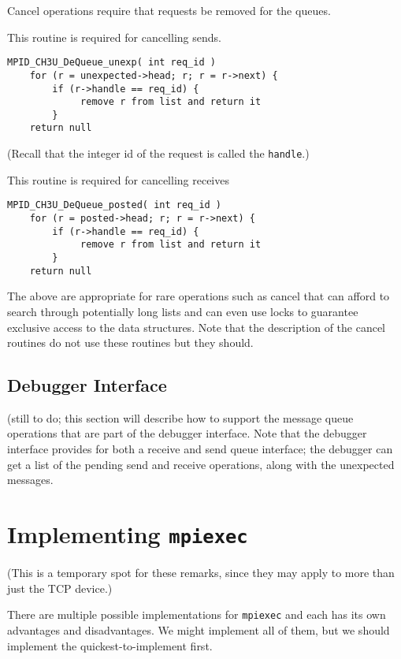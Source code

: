 \documentclass{article}
\def\code{\begingroup\makeustext\eatcode}
\def\eatcode#1{\texttt{#1}\endgroup}
\begin{document}
Cancel operations require that requests be removed for the queues.

This routine is required for cancelling sends.
\begin{verbatim}
MPID_CH3U_DeQueue_unexp( int req_id )
    for (r = unexpected->head; r; r = r->next) {
        if (r->handle == req_id) {
             remove r from list and return it
        }
    return null
\end{verbatim}
(Recall that the integer id of the request is called the \code{handle}.)

This routine is required for cancelling receives
\begin{verbatim}
MPID_CH3U_DeQueue_posted( int req_id )
    for (r = posted->head; r; r = r->next) {
        if (r->handle == req_id) {
             remove r from list and return it
        }
    return null
\end{verbatim}
The above are appropriate for rare operations such as cancel that can 
afford to search through potentially long lists and can even use locks
to guarantee exclusive access to the data structures.  Note that the
description of the cancel routines do not use these routines but they should.

\subsection{Debugger Interface}
(still to do; this section will describe how to support the message
queue operations that are part of the debugger interface.  Note that
the debugger interface provides for both a receive and send queue
interface; the debugger can get a list of the pending send and receive
operations, along with the unexpected messages.

\section{Implementing \code{mpiexec}}
\label{sec:mpiexec}

(This is a temporary spot for these remarks, since they may apply to more than
just the TCP device.)

There are multiple possible implementations for \code{mpiexec} and each has
its own advantages and disadvantages.  We might implement all of them, but we
should implement the quickest-to-implement first.
\end{document}
